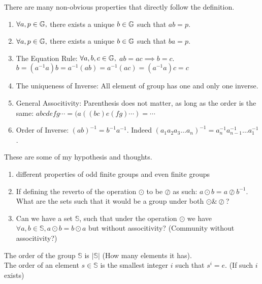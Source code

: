 \documentclass[../note.tex]{subfiles}
\begin{document}
\begin{theorem}
There are many non-obvious properties that directly follow the definition.
\begin{enumerate}
	\item $\forall a, p \in \mathbb{G},$ there exists a unique $b \in \mathbb{G}$ such that $a b = p$.
	\item $\forall a, p \in \mathbb{G},$ there exists a unique $b \in \mathbb{G}$ such that $b a = p$.
	\item The Equation Rule: $\forall a, b, c \in \mathbb{G},$ $a b = a c \implies b = c$.
		\\
		$b=(a^{-1}a)b=a^{-1}(ab)=a^{-1}(ac)=(a^{-1}a)c=c$
	\item The uniqueness of Inverse: All element of group has one and only one inverse.
	\item General Associtivity: Parenthesis does not matter, as long as the order is the same: 
		$a b c d e f g \cdots  = (a ((b c) e (f g)\cdots) = \cdots$
	\item Order of Inverse: $(a b)^{-1}=b^{-1}a^{-1}$. Indeed $(a_1a_2a_3\dots a_n)^{-1} = a_n^{-1}a_{n-1}^{-1}\dots a_1^{-1}$.
\end{enumerate}
\end{theorem}

\begin{hypothesis}
	These are some of my hypothesis and thoughts.
	\begin{enumerate}
		\item different properties of odd finite groups and even finite groups
		\item If defining the reverto of the operation $\odot $ to be $\oslash $ as such: $a \odot b = a \oslash b^{-1}$. What are the sets such that it would be a group under both $\odot \& \oslash$?
		\item Can we have a set $\mathbb{S}$, such that under the operation $\odot $ we have $\forall a, b \in \mathbb{S}, a \odot b = b \odot  a$ but without associtivity? (Community without associtivity?)
	\end{enumerate}
\end{hypothesis}
\begin{definition}
The order of the group $\mathbb{S}$ is $|\mathbb{S}|$ (How many elements it has). \\
The order of an element $s \in \mathbb{S}$ is the smallest integer $i$ such that $s^i = e.$ (If such $i$ exists)
\end{definition}
\end{document}
